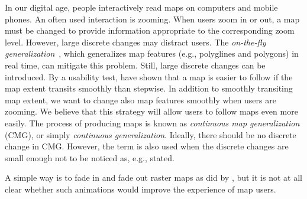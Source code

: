 \documentclass[acmsmall,natbib=false]{acmart}
\begin{document}
In our digital age, people interactively read maps 
on computers and mobile phones.
An often used interaction is zooming. 
When users zoom in or out, 
a map must be changed to provide information 
appropriate to the corresponding zoom level.
However, large discrete changes may distract users.
The \emph{on-the-fly generalization}~\parencite{Weibel2017Fly},
which generalizes map features (e.g., polyglines and polygons) 
in real time, can mitigate this problem.
Still, large discrete changes can be introduced.
By a usability test, \textcite{Midtbo2007} have shown that 
a map is easier to follow 
if the map extent transits smoothly than stepwise. 
In addition to smoothly transiting map extent, 
we want to change also map features smoothly 
when users are zooming.
We believe that this strategy will allow users 
to follow maps even more easily.
The process of producing maps 
is known as \emph{continuous map generalization} (CMG), 
or simply \emph{continuous generalization}.
Ideally, there should be no discrete change in CMG.
However, the term is also used when 
the discrete changes are small enough not to be noticed as,
e.g., \textcite{Suba2016Road} stated.

A simple way  is to fade in and fade out raster maps
as did by \textcite{Pantazis2009b}, 
but it is not at all clear 
whether such animations would improve the experience of map users.
\end{document}
